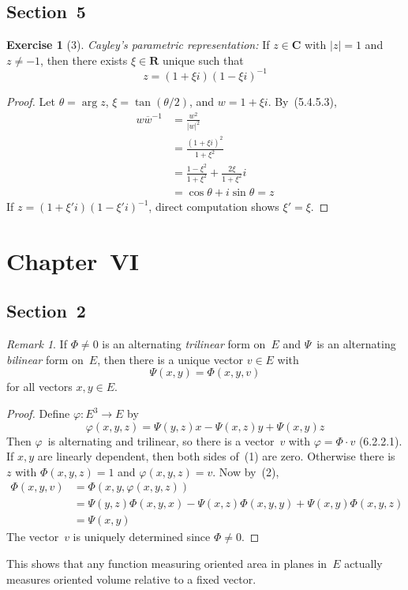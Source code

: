 \documentclass[letterpaper,12pt]{article}
\newcommand{\R}{\mathbf{R}}
\newcommand{\C}{\mathbf{C}}
\newcommand{\mult}{\cdot}
\newcommand{\abs}[1]{|{#1}|}
\newcommand{\conj}[1]{\overline{#1}}
\theoremstyle{definition}
\newtheorem*{exer}{Exercise}
\theoremstyle{remark}
\newtheorem*{rmk}{Remark}
\begin{document}
\subsection*{Section~5}
\begin{exer}[3]
\emph{Cayley's parametric representation:} If \(z\in\C\) with \(\abs{z}=1\) and \(z\ne -1\), then there exists \(\xi\in\R\) unique such that
\[z=(1+\xi i)(1-\xi i)^{-1}\]
\end{exer}
\begin{proof}
Let \(\theta=\arg z\), \(\xi=\tan(\theta/2)\), and \(w=1+\xi i\). By~(5.4.5.3),
\begin{align*}
w\conj{w}^{-1}&=\frac{w^2}{\abs{w}^2}\\
	&=\frac{(1+\xi i)^2}{1+\xi^2}\\
	&=\frac{1-\xi^2}{1+\xi^2}+\frac{2\xi}{1+\xi^2}i\\
	&=\cos\theta+i\sin\theta=z
\end{align*}
If \(z=(1+\xi' i)(1-\xi' i)^{-1}\), direct computation shows \(\xi'=\xi\).
\end{proof}

\section*{Chapter~VI}
\subsection*{Section~2}
\begin{rmk}
If \(\Phi\ne0\) is an alternating \emph{trilinear} form on~\(E\) and \(\Psi\)~is an alternating \emph{bilinear} form on~\(E\), then there is a unique vector \(v\in E\) with
\[\Psi(x,y)=\Phi(x,y,v)\tag{1}\]
for all vectors \(x,y\in E\).
\end{rmk}
\begin{proof}
Define \(\varphi:E^3\to E\) by
\[\varphi(x,y,z)=\Psi(y,z)x-\Psi(x,z)y+\Psi(x,y)z\tag{2}\]
Then \(\varphi\)~is alternating and trilinear, so there is a vector~\(v\) with \(\varphi=\Phi\mult v\) (6.2.2.1). If \(x,y\) are linearly dependent, then both sides of~(1) are zero. Otherwise there is~\(z\) with \(\Phi(x,y,z)=1\) and \(\varphi(x,y,z)=v\). Now by~(2),
\begin{align*}
\Phi(x,y,v)&=\Phi(x,y,\varphi(x,y,z))\\
	&=\Psi(y,z)\Phi(x,y,x)-\Psi(x,z)\Phi(x,y,y)+\Psi(x,y)\Phi(x,y,z)\\
	&=\Psi(x,y)
\end{align*}
The vector~\(v\) is uniquely determined since \(\Phi\ne0\).
\end{proof}
\noindent This shows that any function measuring oriented area in planes in~\(E\) actually measures oriented volume relative to a fixed vector.
\end{document}
